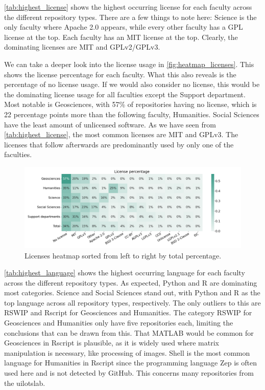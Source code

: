 

\autoref{tab:highest_license} shows the highest occurring license for each faculty across the different repository types. There are a few things to note here: Science is the only faculty where Apache 2.0 appears, while every other faculty has a GPL license at the top. Each faculty has an MIT license at the top. Clearly, the dominating licenses are MIT and GPLv2/GPLv3. 



\newpage
\newpage

We can take a deeper look into the license usage in \autoref{fig:heatmap_licenses}. This shows the license percentage for each faculty. What this also reveals is the percentage of no license usage. If we would also consider no license, this would be the dominating license usage for all faculties except the Support department. Most notable is Geosciences, with 57\% of repositories having no license, which is 22 percentage points more than the following faculty, Humanities. Social Sciences have the least amount of unlicensed software. As we have seen from \autoref{tab:highest_license}, the most common licenses are MIT and GPLv3. The licenses that follow afterwards are predominantly used by only one of the faculties.



\begin{figure}[tbph!]
\centerline{
\includegraphics[scale=0.5]{figures_results/heatmap_licenses.png}}
\caption{Licenses heatmap sorted from left to right by total percentage.
\label{fig:heatmap_licenses}}
\end{figure}


\autoref{tab:highest_language} shows the highest occurring language for each faculty across the different repository types. As expected, Python and R are dominating most categories. Science and Social Sciences stand out, with Python and R as the top language across all repository types, respectively. The only outliers to this are RSWIP and Rscript for Geosciences and Humanities. The category RSWIP for Geosciences and Humanities only have five repositories each, limiting the conclusions that can be drawn from this. That MATLAB would be common for Geosciences in Rscript is plausible, as it is widely used where matrix manipulation is necessary, like processing of images. Shell is the most common language for Humanities in Rscript since the programming language Zep is often used here and is not detected by GitHub. This concerns many repositories from the \acrfull{uilotslab}.


